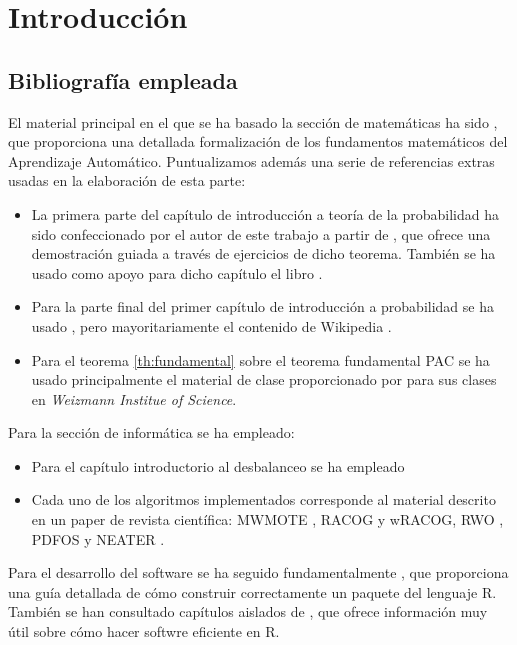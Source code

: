 \chapter*{Introducción}

  \section*{Bibliografía empleada}
  El material principal en el que se ha basado la sección de matemáticas ha sido \citeauthor{shalev}, 
  que proporciona una detallada formalización de los fundamentos matemáticos del Aprendizaje Automático. Puntualizamos además
  una serie de referencias extras usadas en la elaboración de esta parte:
  
  \begin{itemize} 
   \item La primera parte del capítulo de introducción a teoría de la probabilidad ha sido confeccionado por el autor de 
   este trabajo a partir de \citet{caratheodory}, que ofrece una demostración guiada a través de ejercicios de dicho teorema. 
   También se ha usado como apoyo para dicho capítulo el libro \citeauthor{loeve}. 
   \item Para la parte final del primer capítulo de introducción a probabilidad se ha usado \citeauthor{shalev}, pero
   mayoritariamente el contenido de Wikipedia \citep{wiki:markov, wiki:hoeff_lemma, wiki:hoeffding}.
   \item Para el teorema \ref{th:fundamental} sobre el teorema fundamental PAC se ha usado principalmente el material de clase
   proporcionado por \citeauthor{slfetaya} para sus clases en \textit{Weizmann Institue of Science}.
  \end{itemize}
   
   Para la sección de informática se ha empleado:
   
  \begin{itemize}
   \item Para el capítulo introductorio al desbalanceo se ha empleado \citep{he2009} 
   \item Cada uno de los algoritmos implementados corresponde al material descrito en un paper de revista científica: 
   MWMOTE \citep{chawla02}, RACOG y wRACOG\citep{das2015}, RWO \citep{zhang2014}, PDFOS \citep{gao2014} y 
   NEATER \citep{almogahed2014}.
  \end{itemize}

   Para el desarrollo del software se ha seguido fundamentalmente \citep*{rhadleypkg}, que proporciona una guía detallada de
   cómo construir correctamente un paquete del lenguaje R. También se han consultado capítulos aislados de \citep*{rgillespie},
   que ofrece información muy útil sobre cómo hacer softwre eficiente en R.